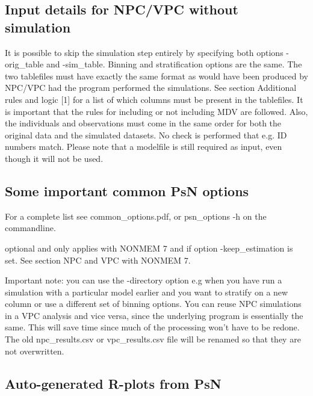 \subsection{Input details for NPC/VPC without simulation}
It is possible to skip the simulation step entirely by specifying both options -orig\_table and -sim\_table.  Binning and stratification options are the same. The two tablefiles must have exactly the same format as would have been produced by NPC/VPC had the program performed the simulations. See section Additional rules and logic [1] for a list of which columns must be present in the tablefiles. It is important that the rules for including or not including MDV are followed. Also, the individuals and observations must come in the same order for both the original data and the simulated datasets. No check is performed that e.g. ID numbers match. Please note that a modelfile is still required as input, even though it will not be used.

\subsection{Some important common PsN options}
For a complete list see common\_options.pdf, 
or psn\_options -h on the commandline.

\begin{optionlist}
optional and only applies with NONMEM 7 and if option -keep\_estimation is set. See section NPC and VPC with NONMEM 7. 
\nextopt
\end{optionlist}

Important note: you can use the -directory option e.g when you have run a 
simulation with a particular model earlier and you want to stratify on a new 
column or use a different set of binning options. You can reuse 
NPC simulations in a VPC analysis and vice versa, since the underlying program 
is essentially the same. 
This will save time since much of the processing won't have to be redone. 
The old npc\_results.csv or vpc\_results.csv file will be renamed so that 
they are not overwritten.

\subsection{Auto-generated R-plots from PsN}
\newcommand{\rplotsconditions}{The default vpc template 
requires the xpose4 R library to be installed.
If the conditions are not fulfilled then no pdf will be generated,
see the .Rout file in the main run directory for error messages.}



